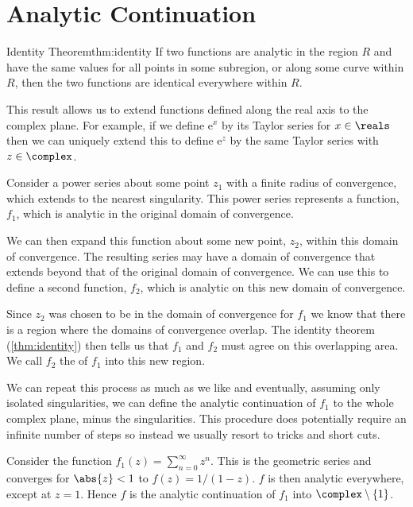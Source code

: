 \documentclass[fleqn]{NotesClass}
\newcommand*{\e}{\mathrm{e}}
\begin{document}
    \section{Analytic Continuation}
    \begin{thm}{Identity Theorem}{thm:identity}
        If two functions are analytic in the region \(R\) and have the same values for all points in some subregion, or along some curve within \(R\), then the two functions are identical everywhere within \(R\).
    \end{thm}
    
    This result allows us to extend functions defined along the real axis to the complex plane.
    For example, if we define \(\e^x\) by its Taylor series for \(x \in \reals\) then we can uniquely extend this to define \(\e^z\) by the same Taylor series with \(z \in \complex\).
    
    Consider a power series about some point \(z_1\) with a finite radius of convergence, which extends to the nearest singularity.
    This power series represents a function, \(f_1\), which is analytic in the original domain of convergence.
    
    We can then expand this function about some new point, \(z_2\), within this domain of convergence.
    The resulting series may have a domain of convergence that extends beyond that of the original domain of convergence.
    We can use this to define a second function, \(f_2\), which is analytic on this new domain of convergence.
    
    Since \(z_2\) was chosen to be in the domain of convergence for \(f_1\) we know that there is a region where the domains of convergence overlap.
    The identity theorem (\cref{thm:identity}) then tells us that \(f_1\) and \(f_2\) must agree on this overlapping area.
    We call \(f_2\) the  of \(f_1\) into this new region.
    
    We can repeat this process as much as we like and eventually, assuming only isolated singularities, we can define the analytic continuation of \(f_1\) to the whole complex plane, minus the singularities.
    This procedure does potentially require an infinite number of steps so instead we usually resort to tricks and short cuts.
    
    \begin{exm}{}{}
        Consider the function \(f_1(z) = \sum_{n=0}^{\infty} z^n\).
        This is the geometric series and converges for \(\abs{z} < 1\) to \(f(z) = 1/(1 - z)\).
        \(f\) is then analytic everywhere, except at \(z = 1\).
        Hence \(f\) is the analytic continuation of \(f_1\) into \(\complex\setminus\{1\}\).
    \end{exm}
    
\end{document}

